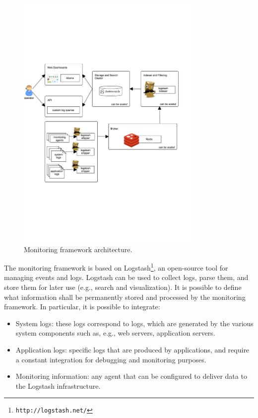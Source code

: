 \begin{figure}[!hbt]
\centering
\includegraphics[width=0.8\textwidth]{figs/monitoring.pdf}
\caption{Monitoring framework architecture.}
\label{fig:monitoringArch}
\end{figure}

The monitoring framework is based on Logstash\footnote{{\tt http://logstash.net/}}, an open-source tool for managing events and logs. Logstash can be used to collect logs, parse them, and store them for later use (e.g., search and visualization). %
It is possible to define what information shall be permanently stored and processed by the monitoring framework. In particular, it is possible to integrate:
\begin{itemize}
\item System logs: these logs correspond to logs, which are generated by the various system components such as, e.g., web servers, application servers. 
\item Application logs: specific logs that are produced by applications, and require a constant integration for debugging and monitoring purposes.
\item Monitoring information: any agent that can be configured to deliver data to the Logstash infrastructure.
\end{itemize}

